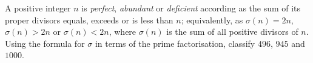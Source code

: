 A positive integer $n$ is \emph{perfect}, \emph{abundant} or \emph{deficient} according as the sum of its proper divisors equals, exceeds or is less than $n$; equivalently, as $\sigma(n)=2n$, $\sigma(n)>2n$ or $\sigma(n)<2n$, where $\sigma(n)$ is the sum of all positive divisors of $n$. Using the formula for $\sigma$ in terms of the prime factorisation, classify $496$, $945$ and $1000$.
